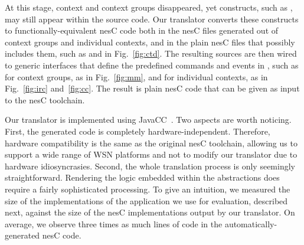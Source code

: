 At this stage, context and context groups disappeared, yet \conesc
constructs, such as , may still appear within the
source code. Our translator converts these constructs to
functionally-equivalent nesC code both in the nesC files generated out
of context groups and individual contexts, and in the plain nesC files
that possibly includes them, such as  and  in
Fig.~\ref{fig:ctd}. The resulting sources are then wired to generic
interfaces that define the predefined commands and events in \conesc,
such as  for context groups, as in
Fig.~\ref{fig:mm}, and  for individual
contexts, as in Fig.~\ref{fig:irc} and~\ref{fig:cc}. The result is
plain nesC code that can be given as input to the nesC toolchain.




Our translator is implemented using JavaCC~\cite{javacc}. Two aspects
are worth noticing. First, the generated code is completely
hardware-independent. Therefore, hardware compatibility is the same as
the original nesC toolchain, allowing us to support a wide range of
WSN platforms and not to modify our translator due to hardware
idiosyncrasies. Second, the whole translation process is only
seemingly straightforward. Rendering the logic embedded within the
\conesc abstractions does require a fairly sophisticated
processing. To give an intuition, we measured the size of the \conesc
implementations of the application we use for evaluation, described
next, against the size of the nesC implementations output by our
translator. On average, we observe three times as much lines of code
in the automatically-generated nesC code.

